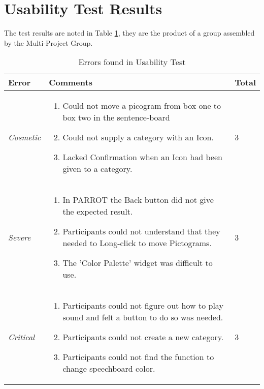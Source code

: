 \section{Usability Test Results}
\label{sec:UseTestRes}
The test results are noted in Table \ref{tab:ErrorsFoundInUsabilityTest}, they are the product of a group assembled by the Multi-Project Group.

\begin{table}
	\centering
		\begin{tabular}{| p{2cm} | p{5cm} | p{2cm} |}
		\hline
			\textbf{Error} & \textbf{Comments} & Total\\
		\hline
			\textit{Cosmetic} & \begin{enumerate}
														\item Could not move a picogram from box one to box two in the sentence-board
														\item Could not supply a category with an Icon.
														\item Lacked Confirmation when an Icon had been given to a category.
													\end{enumerate} & 3 \\ 
		\hline
			\textit{Severe} & \begin{enumerate}
													\item In PARROT the Back button did not give the expected result.
													\item Participants could not understand that they needed to Long-click to move Pictograms.
													\item The 'Color Palette' widget was difficult to use.
												\end{enumerate} & 3 \\
		\hline
			\textit{Critical} & \begin{enumerate}
														\item Participants could not figure out how to play sound and felt a button to do so was needed.
														\item Participants could not create a new category.
														\item Participants could not find the function to change speechboard color.
													\end{enumerate} & 3 \\
		\hline
		\end{tabular}
	\caption{Errors found in Usability Test}
	\label{tab:ErrorsFoundInUsabilityTest}
\end{table}